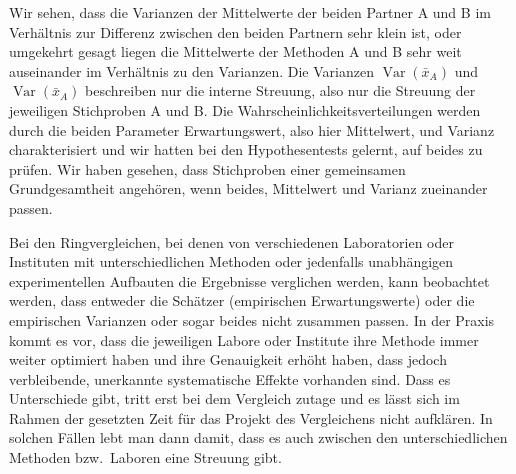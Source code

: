
Wir sehen, dass die Varianzen der Mittelwerte der beiden Partner A und B im Verhältnis zur
Differenz zwischen den beiden Partnern sehr klein ist, oder umgekehrt gesagt liegen die 
Mittelwerte der Methoden A und B sehr weit auseinander im Verhältnis zu den Varianzen.
Die Varianzen $\operatorname{Var}(\bar x_A)$ und $\operatorname{Var}(\bar x_A)$ beschreiben
nur die interne Streuung, also nur die Streuung der jeweiligen Stichproben A und B.
Die Wahrscheinlichkeitsverteilungen werden durch die beiden Parameter Erwartungswert,
also hier Mittelwert, und Varianz charakterisiert und wir hatten bei den Hypothesentests
gelernt, auf beides zu prüfen. Wir haben gesehen, dass Stichproben einer gemeinsamen
Grundgesamtheit angehören, wenn beides, Mittelwert und Varianz zueinander passen.

Bei den Ringvergleichen, bei denen von verschiedenen Laboratorien oder Instituten mit
unterschiedlichen Methoden oder jedenfalls unabhängigen experimentellen Aufbauten die
Ergebnisse verglichen werden, kann beobachtet werden, dass entweder die
Schätzer (empirischen Erwartungswerte) oder die empirischen Varianzen oder sogar
beides nicht zusammen passen. In der Praxis kommt es vor, dass die jeweiligen
Labore oder Institute ihre Methode immer weiter optimiert haben und ihre Genauigkeit
erhöht haben, dass jedoch verbleibende, unerkannte systematische Effekte vorhanden sind.
Dass es Unterschiede gibt, tritt erst bei dem Vergleich zutage und es lässt sich
im Rahmen der gesetzten Zeit für das Projekt des Vergleichens nicht aufklären.
In solchen Fällen lebt man dann damit, dass es auch zwischen den unterschiedlichen
Methoden bzw.\ Laboren eine Streuung gibt.

